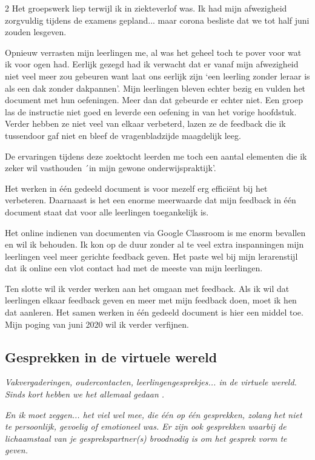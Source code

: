 \begin{multicols} {2}
Het groepswerk liep terwijl ik in ziekteverlof was. Ik had mijn afwezigheid zorgvuldig tijdens de examens gepland... maar corona besliste dat we tot half juni zouden lesgeven.

Opnieuw verrasten mijn leerlingen me, al was het geheel toch te pover voor wat ik voor ogen had. Eerlijk gezegd had ik verwacht dat er vanaf mijn afwezigheid niet veel meer zou gebeuren want laat ons eerlijk zijn `een leerling zonder leraar is als een dak zonder dakpannen'. Mijn leerlingen bleven echter bezig en vulden het document met hun oefeningen. Meer dan dat gebeurde er echter niet. Een groep las de instructie niet goed en leverde een oefening in van het vorige hoofdstuk. Verder hebben ze niet veel van elkaar verbeterd, lazen ze de feedback die ik tussendoor gaf niet en bleef de vragenbladzijde maagdelijk leeg.

De ervaringen tijdens deze zoektocht leerden me toch een aantal elementen die ik zeker wil vasthouden ´in mijn gewone onderwijspraktijk'. 

Het werken in één gedeeld document is voor mezelf erg efficiënt bij het verbeteren. Daarnaast is het een enorme meerwaarde dat mijn feedback in één document staat dat voor alle leerlingen toegankelijk is. 

Het online indienen van documenten via Google Classroom is me enorm bevallen en wil ik behouden. Ik kon op de duur zonder al te veel extra inspanningen mijn leerlingen veel meer gerichte feedback geven. Het paste wel bij mijn lerarenstijl dat ik online een vlot contact had met de meeste van mijn leerlingen.

Ten slotte wil ik verder werken aan het omgaan met feedback. Als ik wil dat leerlingen elkaar feedback geven en meer met mijn feedback doen, moet ik hen dat aanleren. Het samen werken in één gedeeld document is hier een middel toe. Mijn poging van juni 2020 wil ik verder verfijnen. 

\subsection{Gesprekken in de virtuele wereld}
\emph{Vakvergaderingen, oudercontacten, leerlingengesprekjes... in de virtuele wereld. Sinds kort hebben we het allemaal gedaan .} 

\emph{En ik moet zeggen... het viel wel mee, die één op één gesprekken, zolang het niet te persoonlijk, gevoelig of emotioneel was. Er zijn ook gesprekken waarbij de lichaamstaal van je gesprekspartner(s) broodnodig is om het gesprek vorm te geven.}


\end{multicols}
